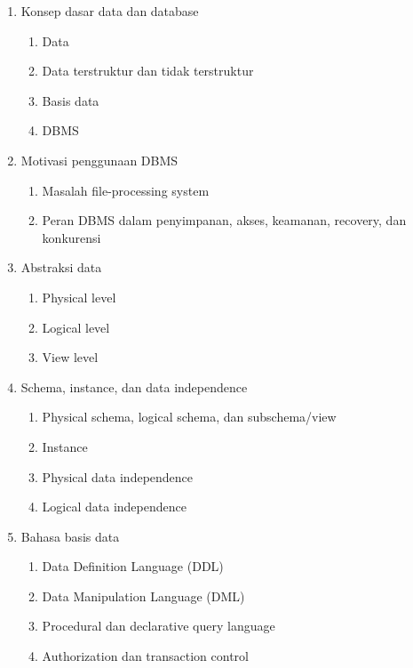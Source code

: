 \begin{enumerate}
    \item \pwajib Konsep dasar data dan database
    \begin{enumerate}
        \item \pwajib Data
        \item \pwajib Data terstruktur dan tidak terstruktur
        \item \pwajib Basis data
        \item \pwajib DBMS
    \end{enumerate}
    \item \pwajib Motivasi penggunaan DBMS
    \begin{enumerate}
        \item \pwajib Masalah file-processing system
        \item \pwajib Peran DBMS dalam penyimpanan, akses, keamanan, recovery, dan konkurensi
    \end{enumerate}
    \item \pwajib Abstraksi data
    \begin{enumerate}
        \item \pwajib Physical level
        \item \pwajib Logical level
        \item \pwajib View level
    \end{enumerate}
    \item \pwajib Schema, instance, dan data independence
    \begin{enumerate}
        \item \pwajib Physical schema, logical schema, dan subschema/view
        \item \pwajib Instance
        \item \pwajib Physical data independence
        \item \ppaham Logical data independence
    \end{enumerate}
    \item \pwajib Bahasa basis data
    \begin{enumerate}
        \item \pwajib Data Definition Language (DDL)
        \item \pwajib Data Manipulation Language (DML)
        \item \pwajib Procedural dan declarative query language
        \item \ppaham Authorization dan transaction control
    \end{enumerate}

\end{enumerate}
